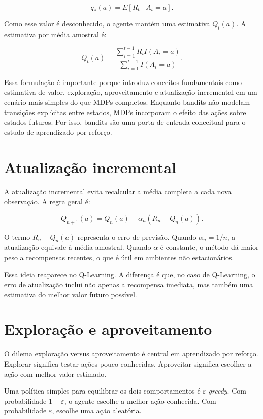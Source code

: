 \begin{equation}
q_*(a) = E[R_t \mid A_t = a].
\end{equation}

Como esse valor é desconhecido, o agente mantém uma estimativa $Q_t(a)$.
A estimativa por média amostral é:

\begin{equation}
Q_t(a) =
\frac{\sum_{i=1}^{t-1} R_i I(A_i = a)}
{\sum_{i=1}^{t-1} I(A_i = a)}.
\end{equation}

Essa formulação é importante porque introduz conceitos fundamentais como
estimativa de valor, exploração, aproveitamento e atualização incremental em
um cenário mais simples do que MDPs completos.
Enquanto bandits não modelam transições explícitas entre estados, MDPs
incorporam o efeito das ações sobre estados futuros.
Por isso, bandits são uma porta de entrada conceitual para o
estudo de aprendizado por reforço.

\section{Atualização incremental}

A atualização incremental evita recalcular a média completa a cada nova
observação.
A regra geral é:

\begin{equation}
Q_{n+1}(a) = Q_n(a) + \alpha_n(R_n - Q_n(a)).
\end{equation}

O termo $R_n - Q_n(a)$ representa o erro de previsão.
Quando $\alpha_n = 1/n$, a atualização equivale à média amostral.
Quando $\alpha$ é constante, o método dá maior peso a recompensas recentes,
o que é útil em ambientes não estacionários.

Essa ideia reaparece no Q-Learning.
A diferença é que, no caso de Q-Learning, o erro de atualização inclui
não apenas a recompensa imediata, mas também uma estimativa do melhor
valor futuro possível.

\section{Exploração e aproveitamento}

O dilema exploração versus aproveitamento é central em aprendizado por
reforço.
Explorar significa testar ações pouco conhecidas.
Aproveitar significa escolher a ação com melhor valor estimado.

Uma política simples para equilibrar os dois comportamentos é
$\varepsilon$-\textit{greedy}.
Com probabilidade $1-\varepsilon$, o agente escolhe a melhor ação conhecida.
Com probabilidade $\varepsilon$, escolhe uma ação aleatória.


